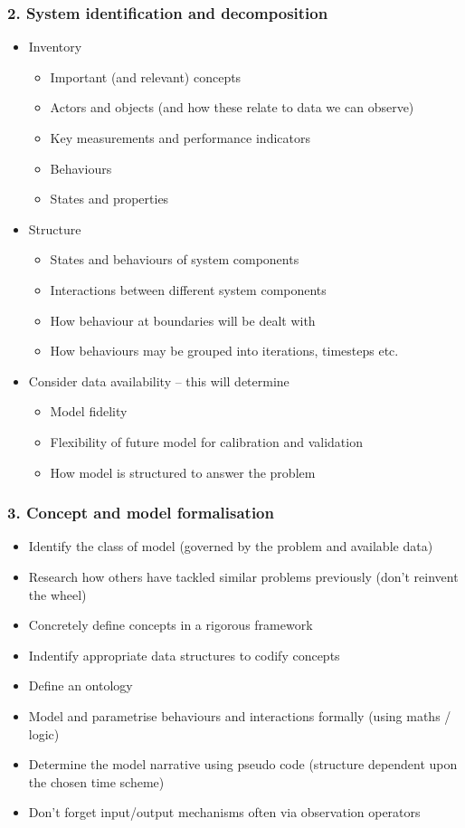 \subsubsection{2. System identification and decomposition}
\begin{itemize}
\item Inventory
\begin{itemize}
\item Important (and relevant) concepts
\item Actors and objects (and how these relate to data we can observe)
\item Key measurements and performance indicators
\item Behaviours
\item States and properties
\end{itemize}
\item Structure
\begin{itemize}
\item States and behaviours of system components
\item Interactions between different system components
\item How behaviour at boundaries will be dealt with
\item How behaviours may be grouped into iterations, timesteps etc.
\end{itemize}
\item Consider data availability -- this will determine
\begin{itemize}
\item Model fidelity
\item Flexibility of future model for calibration and validation
\item How model is structured to answer the problem
\end{itemize}
\end{itemize}

\subsubsection{3. Concept and model formalisation}
\begin{itemize}
\item Identify the class of model (governed by the problem and available data)
\item Research how others have tackled similar problems previously (don't reinvent 
the wheel)
\item Concretely define concepts in a rigorous framework
\item Indentify appropriate data structures to codify concepts
\item Define an ontology
\item Model and parametrise behaviours and interactions formally (using maths / logic)
\item Determine the model narrative using pseudo code (structure dependent upon the chosen time scheme)
\item Don't forget input/output mechanisms often via observation operators
\end{itemize}


